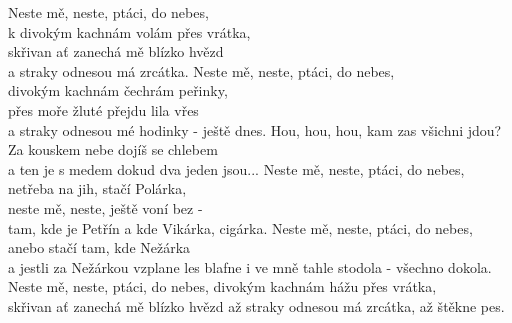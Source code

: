 \ve{}
Neste mě, neste, ptáci, do nebes,\\
k divokým kachnám volám přes vrátka,\\
skřivan ať zanechá mě blízko hvězd\\
a straky odnesou má zrcátka.
\ve{}
Neste mě, neste, ptáci, do nebes,\\
divokým kachnám čechrám peřinky,\\
přes moře žluté přejdu lila vřes\\
a straky odnesou mé hodinky - ještě dnes.
\cho{}
Hou, hou, hou,
kam zas všichni jdou?\\
Za kouskem nebe dojíš se chlebem\\
a ten je s medem dokud dva jeden jsou...
\ve{}
Neste mě, neste, ptáci, do nebes,\\
netřeba na jih, stačí Polárka,\\
neste mě, neste, ještě voní bez -\\
tam, kde je Petřín a kde Vikárka, cigárka.
\cho{}
\ve{}
Neste mě, neste, ptáci, do nebes,
anebo stačí tam, kde Nežárka\\
a jestli za Nežárkou vzplane les
blafne i ve mně tahle stodola - všechno dokola.
\ve{}
Neste mě, neste, ptáci, do nebes,
divokým kachnám hážu přes vrátka,\\
skřivan ať zanechá mě blízko hvězd
až straky odnesou má zrcátka, až štěkne pes.
\cho{}
\esong{}